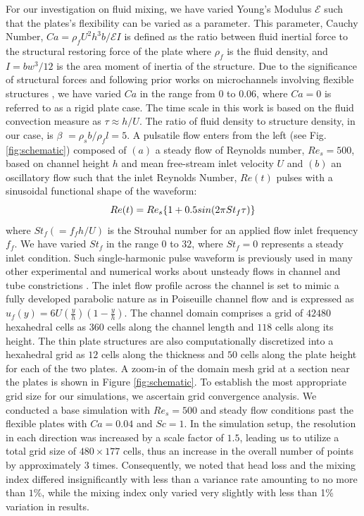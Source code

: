 \documentclass[%
 aip,
 amsmath,amssymb,
 reprint,
]{revtex4-1}
\begin{document}
For our investigation on fluid mixing, we have varied Young's Modulus $\mathcal{E}$ such that the plates's flexibility can be varied as a parameter. This parameter, Cauchy Number, $Ca=\rho_f U^2 h^3 b/{\mathcal{E}I}$ is defined as the ratio between fluid inertial force to the structural restoring force of the plate where $\rho_f$ is the fluid density, and $I=bw^3/12$ is the area moment of inertia of the structure. Due to the significance of structural forces and following prior works on microchannels involving flexible structures \citep{Vandenberghe2004}, we have varied $Ca$ in the range from $0$ to $0.06$, where $Ca=0$ is referred to as a rigid plate case. The time scale in this work is based on the fluid convection measure as $\tau \approx h/U$. The ratio of fluid density to structure density, in our case, is $\beta$ $=\rho_s b / \rho_f l = 5$. A pulsatile flow enters from the left (see Fig. \ref{fig:schematic}) composed of $(a)$ a steady flow of Reynolds number, $Re_{s} = 500$, based on channel height $h$ and mean free-stream inlet velocity $U$ and $(b)$ an oscillatory flow such that the inlet Reynolds Number, ${Re}(t)$ pulses with a sinusoidal functional shape of the waveform:
\begin{equation*}
	\centering
	{Re}(t) = {Re_s}\{1+0.5sin(2\pi St_f \tau)\}
	\label{eqn:pulse}
\end{equation*}
where $St_f (= f_f h/U)$ is the Strouhal number for an applied flow inlet frequency $f_f$. We have varied $St_f$ in the range $0$ to $32$, where $St_f=0$ represents a steady inlet condition. Such single-harmonic pulse waveform is previously used in many other experimental and numerical works about unsteady flows in channel and tube constrictions \cite{Giddens1984, hummel1989, carmo2019}. The inlet flow profile across the channel is set to mimic a fully developed parabolic nature as in Poiseuille channel flow and is expressed as $u_f(y)=6U\left(\frac{y}{h}\right)\left(1-\frac{y}{h}\right)$. The channel domain comprises a grid of $42480$ hexahedral cells as $360$ cells along the channel length and $118$ cells along its height. The thin plate structures are also computationally discretized into a hexahedral grid as $12$ cells along the thickness and $50$ cells along the plate height for each of the two plates. A zoom-in of the domain mesh grid at a section near the plates is shown in Figure \ref{fig:schematic}. To establish the most appropriate grid size for our simulations, we ascertain grid convergence analysis. We conducted a base simulation with $Re_s=500$ and steady flow conditions past the flexible plates with $Ca=0.04$ and $Sc=1$. In the simulation setup, the resolution in each direction was increased by a scale factor of $1.5$, leading us to utilize a total grid size of $480 \times 177$ cells, thus an increase in the overall number of points by approximately $3$ times. Consequently, we noted that head loss and the mixing index differed insignificantly with less than a variance rate amounting to no more than $1\%$, while the mixing index only varied very slightly with less than 1\% variation in results. 
\end{document}
